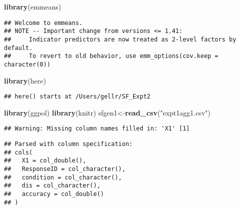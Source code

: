 \documentclass[]{article}
\newenvironment{Shaded}{\begin{snugshade}}{\end{snugshade}}
\newcommand{\CommentTok}[1]{\textcolor[rgb]{0.56,0.35,0.01}{\textit{#1}}}
\newcommand{\DataTypeTok}[1]{\textcolor[rgb]{0.13,0.29,0.53}{#1}}
\newcommand{\KeywordTok}[1]{\textcolor[rgb]{0.13,0.29,0.53}{\textbf{#1}}}
\newcommand{\NormalTok}[1]{#1}
\newcommand{\OperatorTok}[1]{\textcolor[rgb]{0.81,0.36,0.00}{\textbf{#1}}}
\newcommand{\StringTok}[1]{\textcolor[rgb]{0.31,0.60,0.02}{#1}}
\begin{document}
\begin{Shaded}
\begin{Highlighting}[]
\KeywordTok{library}\NormalTok{(emmeans)}
\end{Highlighting}
\end{Shaded}

\begin{verbatim}
## Welcome to emmeans.
## NOTE -- Important change from versions <= 1.41:
##     Indicator predictors are now treated as 2-level factors by default.
##     To revert to old behavior, use emm_options(cov.keep = character(0))
\end{verbatim}

\begin{Shaded}
\begin{Highlighting}[]
\KeywordTok{library}\NormalTok{(here)}
\end{Highlighting}
\end{Shaded}

\begin{verbatim}
## here() starts at /Users/gellr/SF_Expt2
\end{verbatim}

\begin{Shaded}
\begin{Highlighting}[]
\KeywordTok{library}\NormalTok{(ggpol)}
\KeywordTok{library}\NormalTok{(knitr)}
\NormalTok{sfgen1<-}\KeywordTok{read_csv}\NormalTok{(}\StringTok{"expt1agg1.csv"}\NormalTok{)}
\end{Highlighting}
\end{Shaded}

\begin{verbatim}
## Warning: Missing column names filled in: 'X1' [1]
\end{verbatim}

\begin{verbatim}
## Parsed with column specification:
## cols(
##   X1 = col_double(),
##   ResponseID = col_character(),
##   condition = col_character(),
##   dis = col_character(),
##   accuracy = col_double()
## )
\end{verbatim}

\begin{Shaded}
\end{Shaded}
\end{document}
